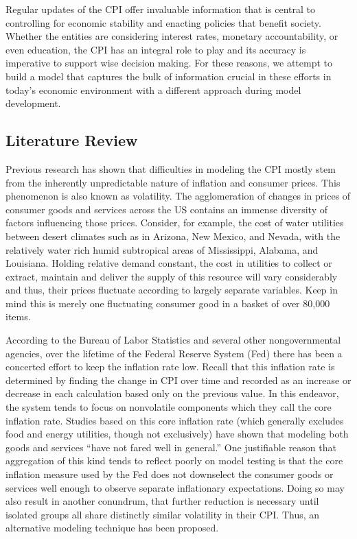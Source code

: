 \documentclass[
]{article}
\begin{document}
Regular updates of the CPI offer invaluable information that is central
to controlling for economic stability and enacting policies that benefit
society. Whether the entities are considering interest rates, monetary
accountability, or even education, the CPI has an integral role to play
and its accuracy is imperative to support wise decision making. For
these reasons, we attempt to build a model that captures the bulk of
information crucial in these efforts in today's economic environment
with a different approach during model development.

\hypertarget{literature-review}{%
\subsection{Literature Review}\label{literature-review}}

Previous research has shown that difficulties in modeling the CPI mostly
stem from the inherently unpredictable nature of inflation and consumer
prices. This phenomenon is also known as volatility. The agglomeration
of changes in prices of consumer goods and services across the US
contains an immense diversity of factors influencing those prices.
Consider, for example, the cost of water utilities between desert
climates such as in Arizona, New Mexico, and Nevada, with the relatively
water rich humid subtropical areas of Mississippi, Alabama, and
Louisiana. Holding relative demand constant, the cost in utilities to
collect or extract, maintain and deliver the supply of this resource
will vary considerably and thus, their prices fluctuate according to
largely separate variables. Keep in mind this is merely one fluctuating
consumer good in a basket of over 80,000 items.

According to the Bureau of Labor Statistics and several other
nongovernmental agencies, over the lifetime of the Federal Reserve
System (Fed) there has been a concerted effort to keep the inflation
rate low. Recall that this inflation rate is determined by finding the
change in CPI over time and recorded as an increase or decrease in each
calculation based only on the previous value. In this endeavor, the
system tends to focus on nonvolatile components which they call the core
inflation rate. Studies based on this core inflation rate (which
generally excludes food and energy utilities, though not exclusively)
have shown that modeling both goods and services ``have not fared well
in general.'' One justifiable reason that aggregation of this kind tends
to reflect poorly on model testing is that the core inflation measure
used by the Fed does not downselect the consumer goods or services well
enough to observe separate inflationary expectations. Doing so may also
result in another conundrum, that further reduction is necessary until
isolated groups all share distinctly similar volatility in their CPI.
Thus, an alternative modeling technique has been proposed.
\end{document}
